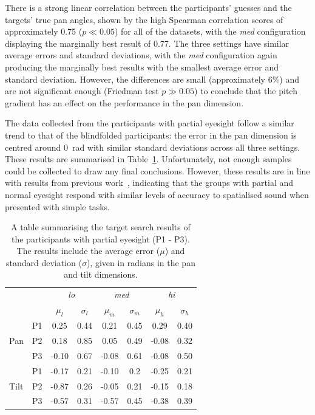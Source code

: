 \documentclass[sigconf, review=true, screen=true, anonymous=true]{acmart}
\begin{document}
There is a strong linear correlation between the participants' guesses and the targets' true pan angles, shown by the high Spearman correlation scores of approximately 0.75 ($p \ll 0.05$) for all of the datasets, with the \emph{med} configuration displaying the marginally best result of 0.77.
The three settings have similar average errors and standard deviations, with the \emph{med} configuration again producing the marginally best results with the smallest average error and standard deviation.
However, the differences are small (approximately 6\%) and are not significant enough (Friedman test $p \gg 0.05$) to conclude that the pitch gradient has an effect on the performance in the pan dimension. 

The data collected from the participants with partial eyesight follow a similar trend to that of the blindfolded participants: the error in the pan dimension is centred around \SI{0}{\radian} with similar standard deviations across all three settings.
These results are summarised in Table~\ref{tab:vi-results}.
Unfortunately, not enough samples could be collected to draw any final conclusions.
However, these results are in line with results from previous work~\cite{zwiers2001spatial}, indicating that the groups with partial and normal eyesight respond with similar levels of accuracy to spatialised sound when presented with simple tasks. 

\begin{table}
  \centering
  \caption{A table summarising the target search results of the participants with partial eyesight (P1 - P3). The results include the average error ($\mu$) and standard deviation ($\sigma$), given in radians in the pan and tilt dimensions.}\label{tab:vi-results}
  \begin{tabular}{llcccccc}
    \toprule
    \multicolumn{2}{c}{} & \multicolumn{2}{c}{\emph{lo}} & \multicolumn{2}{c}{\emph{med}} & \multicolumn{2}{c}{\emph{hi}} \\
    \multicolumn{2}{c}{} & $\mu_l$ & $\sigma_l$ & $\mu_m$ & $\sigma_m$ & $\mu_h$ & $\sigma_h$ \\\midrule
         & P1 &  0.25 & 0.44 &  0.21 & 0.45 &  0.29 & 0.40 \\%
    Pan  & P2 &  0.18 & 0.85 &  0.05 & 0.49 & -0.08 & 0.32 \\%
         & P3 & -0.10 & 0.67 & -0.08 & 0.61 & -0.08 & 0.50 \\ \midrule
         & P1 & -0.17 & 0.21 & -0.10 & 0.2  & -0.25 & 0.21 \\%
    Tilt & P2 & -0.87 & 0.26 & -0.05 & 0.21 & -0.15 & 0.18 \\%
         & P3 & -0.57 & 0.31 & -0.57 & 0.45 & -0.38 & 0.39 \\%
    \bottomrule
  \end{tabular}
\end{table}
\end{document}
